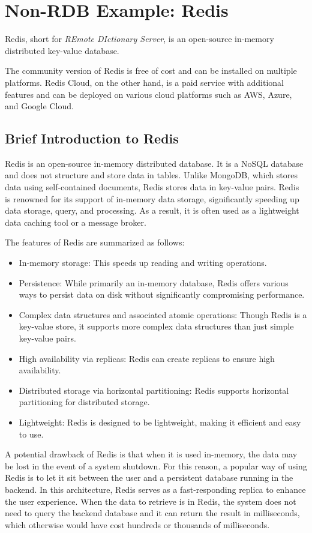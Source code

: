 \chapter{Non-RDB Example: Redis}

Redis, short for \textit{REmote DIctionary Server}, is an open-source in-memory distributed key-value database.

The community version of Redis is free of cost and can be installed on multiple platforms. Redis Cloud, on the other hand, is a paid service with additional features and can be deployed on various cloud platforms such as AWS, Azure, and Google Cloud.

\section{Brief Introduction to Redis}

Redis is an open-source in-memory distributed database. It is a NoSQL database and does not structure and store data in tables. Unlike MongoDB, which stores data using self-contained documents, Redis stores data in key-value pairs. Redis is renowned for its support of in-memory data storage, significantly speeding up data storage, query, and processing. As a result, it is often used as a lightweight data caching tool or a message broker.

The features of Redis are summarized as follows:
\begin{itemize}
	\item In-memory storage: This speeds up reading and writing operations.
	\item Persistence: While primarily an in-memory database, Redis offers various ways to persist data on disk without significantly compromising performance.
	\item Complex data structures and associated atomic operations: Though Redis is a key-value store, it supports more complex data structures than just simple key-value pairs.
	\item High availability via replicas: Redis can create replicas to ensure high availability.
	\item Distributed storage via horizontal partitioning: Redis supports horizontal partitioning for distributed storage.
	\item Lightweight: Redis is designed to be lightweight, making it efficient and easy to use.
\end{itemize}

A potential drawback of Redis is that when it is used in-memory, the data may be lost in the event of a system shutdown. For this reason, a popular way of using Redis is to let it sit between the user and a persistent database running in the backend. In this architecture, Redis serves as a fast-responding replica to enhance the user experience. When the data to retrieve is in Redis, the system does not need to query the backend database and it can return the result in milliseconds, which otherwise would have cost hundreds or thousands of milliseconds.

